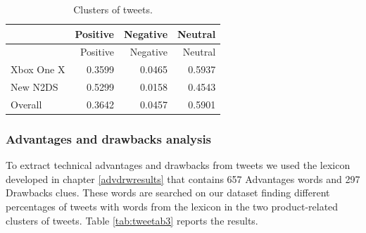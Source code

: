 \documentclass[]{book}
\begin{document}
\begin{longtable}[]{@{}lrrr@{}}
\caption{\label{tab:tweetab2} Clusters of tweets.}\tabularnewline
\toprule
& Positive & Negative & Neutral\tabularnewline
\midrule
\endfirsthead
\toprule
& Positive & Negative & Neutral\tabularnewline
\midrule
\endhead
Xbox One X & 0.3599 & 0.0465 & 0.5937\tabularnewline
New N2DS & 0.5299 & 0.0158 & 0.4543\tabularnewline
Overall & 0.3642 & 0.0457 & 0.5901\tabularnewline
\bottomrule
\end{longtable}

\subsubsection*{Advantages and drawbacks
analysis}\label{advantages-and-drawbacks-analysis}

To extract technical advantages and drawbacks from tweets we used the
lexicon developed in chapter \ref{advdrwresults} that contains 657
Advantages words and 297 Drawbacks clues. These words are searched on
our dataset finding different percentages of tweets with words from the
lexicon in the two product-related clusters of tweets. Table
\ref{tab:tweetab3} reports the results.
\end{document}
